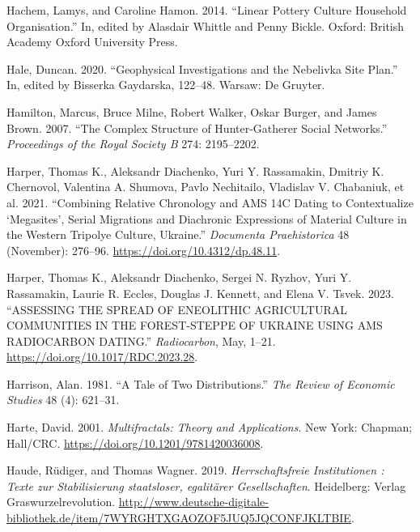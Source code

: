 \documentclass[
  12pt,
  a4paper, twoside]{book}
\newlength{\cslhangindent}
\newlength{\cslentryspacingunit} %
\newenvironment{CSLReferences}[2] %
 {%
  \setlength{\parindent}{0pt}
  \ifodd #1
  \let\oldpar\par
  \def\par{\hangindent=\cslhangindent\oldpar}
  \fi
  \setlength{\parskip}{#2\cslentryspacingunit}
 }%
 {}
\begin{document}
\begin{CSLReferences}{1}{0}
\leavevmode{}%
Hachem, Lamys, and Caroline Hamon. 2014. {``Linear Pottery Culture Household Organisation.''} In, edited by Alasdair Whittle and Penny Bickle. Oxford: British Academy Oxford University Press.

\leavevmode{}%
Hale, Duncan. 2020. {``Geophysical Investigations and the Nebelivka Site Plan.''} In, edited by Bisserka Gaydarska, 122--48. Warsaw: De Gruyter.

\leavevmode{}%
Hamilton, Marcus, Bruce Milne, Robert Walker, Oskar Burger, and James Brown. 2007. {``The Complex Structure of Hunter-Gatherer Social Networks.''} \emph{Proceedings of the Royal Society B} 274: 2195--2202.

\leavevmode{}%
Harper, Thomas K., Aleksandr Diachenko, Yuri Y. Rassamakin, Dmitriy K. Chernovol, Valentina A. Shumova, Pavlo Nechitailo, Vladislav V. Chabaniuk, et al. 2021. {``Combining Relative Chronology and AMS 14C Dating to Contextualize {`}Megasites{'}, Serial Migrations and Diachronic Expressions of Material Culture in the Western Tripolye Culture, Ukraine.''} \emph{Documenta Praehistorica} 48 (November): 276--96. \url{https://doi.org/10.4312/dp.48.11}.

\leavevmode{}%
Harper, Thomas K., Aleksandr Diachenko, Sergei N. Ryzhov, Yuri Y. Rassamakin, Laurie R. Eccles, Douglas J. Kennett, and Elena V. Tsvek. 2023. {``ASSESSING THE SPREAD OF ENEOLITHIC AGRICULTURAL COMMUNITIES IN THE FOREST-STEPPE OF UKRAINE USING AMS RADIOCARBON DATING.''} \emph{Radiocarbon}, May, 1--21. \url{https://doi.org/10.1017/RDC.2023.28}.

\leavevmode{}%
Harrison, Alan. 1981. {``A Tale of Two Distributions.''} \emph{The Review of Economic Studies} 48 (4): 621--31.

\leavevmode{}%
Harte, David. 2001. \emph{Multifractals: Theory and Applications}. New York: Chapman; Hall/CRC. \url{https://doi.org/10.1201/9781420036008}.

\leavevmode{}%
Haude, Rüdiger, and Thomas Wagner. 2019. \emph{Herrschaftsfreie Institutionen : Texte zur Stabilisierung staatsloser, egalitärer Gesellschaften}. Heidelberg: Verlag Graswurzelrevolution. \url{http://www.deutsche-digitale-bibliothek.de/item/7WYRGHTXGAOZOF5JUQ5JQCONFJKLTBIE}.


\end{CSLReferences}
\end{document}
